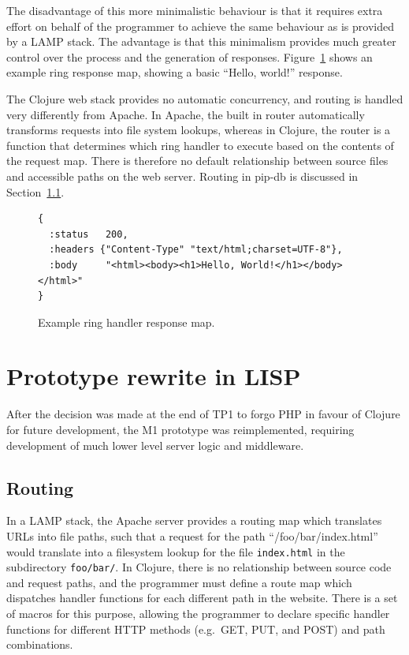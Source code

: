The disadvantage of this more minimalistic behaviour is that it
requires extra effort on behalf of the programmer to achieve the same
behaviour as is provided by a LAMP stack. The advantage is that this
minimalism provides much greater control over the process and the
generation of responses. Figure~\ref{fig:ring-response-map} shows an
example ring response map, showing a basic ``Hello, world!'' response.

The Clojure web stack provides no automatic concurrency, and routing
is handled very differently from Apache. In Apache, the built in
router automatically transforms requests into file system lookups,
whereas in Clojure, the router is a function that determines which
ring handler to execute based on the contents of the request
map. There is therefore no default relationship between source files
and accessible paths on the web server. Routing in pip-db is discussed
in Section~\ref{subsec:routing}.


\begin{figure}[H]
\begin{verbatim}
{
  :status   200,
  :headers {"Content-Type" "text/html;charset=UTF-8"},
  :body     "<html><body><h1>Hello, World!</h1></body></html>"
}
\end{verbatim}
\caption[Example ring handler response map]
        {Example ring handler response map.}
\label{fig:ring-response-map}
\end{figure}


\newpage
\section{Prototype rewrite in LISP}\label{sec:prototype-rewrite}

After the decision was made at the end of TP1 to forgo PHP in favour
of Clojure for future development, the M1 prototype was reimplemented,
requiring development of much lower level server logic and middleware.

\subsection{Routing}\label{subsec:routing}

In a LAMP stack, the Apache server provides a routing map which
translates URLs into file paths, such that a request for the path
``/foo/bar/index.html'' would translate into a filesystem lookup for
the file \texttt{index.html} in the subdirectory \texttt{foo/bar/}. In
Clojure, there is no relationship between source code and request
paths, and the programmer must define a route map which dispatches
handler functions for each different path in the website. There is a
set of macros for this purpose, allowing the programmer to declare
specific handler functions for different HTTP methods (e.g.\ GET, PUT,
and POST) and path combinations.

